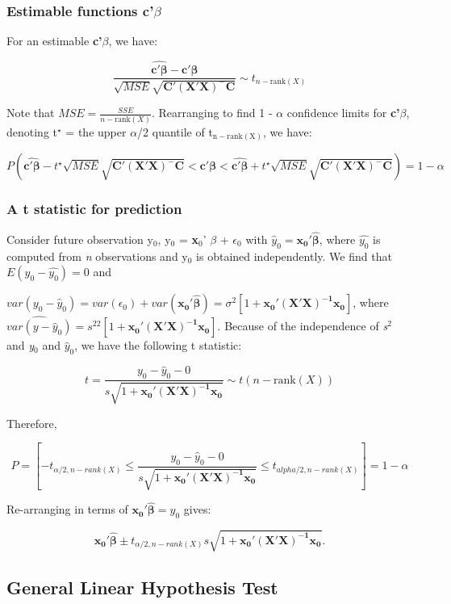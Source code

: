 \documentclass[11pt]{article}
\begin{document}
{\subsubsection{Estimable functions \textbf{c'$\beta$}}
\label{sec-4-2-2}


For an estimable \textbf{c'$\beta$}, we have:

$$\frac{\widehat{\mathbf{c'\beta}} -
\mathbf{c'\beta}}{\sqrt{MSE}\sqrt{\mathbf{C'(X'X)^{-}C}}} \sim
t_{n-\mathrm{rank}(X)}$$

Note that $MSE = \frac{SSE}{n-\mathrm{rank}(X)}$. Rearranging to find 1 - $\alpha$ confidence limits for \textbf{c'$\beta$},
denoting t$^{\star}$ = the upper $\alpha$/2 quantile of t$_{\mathrm{n-rank(X)}}$, we
have:

$$P\left( \widehat{\mathbf{c'\beta}} -
t^{\star}\sqrt{MSE}\sqrt{\mathbf{C'(X'X)^{-}C}} < \mathbf{c'\beta} <  \widehat{\mathbf{c'\beta}} +
t^{\star}\sqrt{MSE}\sqrt{\mathbf{C'(X'X)^{-}C}} \right) = 1 - \alpha$$
\subsubsection{A t statistic for prediction}
\label{sec-4-2-3}


Consider future observation y$_0$, y$_0$ = \textbf{x$_0$}' $\beta$ + $\epsilon$$_0$ with
$\hat{y}_0 = \mathbf{x_0'\hat{\beta}}$, where $\hat{y_0}$ is computed
from \emph{n} observations and y$_0$ is obtained independently. We find that
$E(y_0 - \hat{y_0}) = 0$ and 


$var(y_0 - \hat{y}_0) = var(\epsilon_0) +
var(\mathbf{x_0'\hat{\beta}}) = \sigma^2[1+
\mathbf{x_0'(X'X)^{-1}x_0}]$, where 
$\widehat{var(y - \hat{y}_0)} = s^22[1+ \mathbf{x_0'(X'X)^{-1}x_0}]$. Because of the independence of \emph{s$^2$}
and \emph{y$_0$} and $\hat{y}_0$, we have the following t statistic:

$$t = \frac{y_0 - \hat{y}_0 - 0}{s\sqrt{1+
\mathbf{x_0'(X'X)^{-1}x_0}}} \sim t(n-\mathrm{rank}(X))$$



Therefore,

$$P = \left[ -t_{\alpha/2,n-rank(X)} \leq \frac{y_0 - \hat{y}_0 - 0}{s\sqrt{1+
\mathbf{x_0'(X'X)^{-1}x_0}}} \leq t_{alpha/2,n-rank(X)}\right] = 1 -
\alpha$$

Re-arranging in terms of $\mathbf{x_0'\hat{\beta}} = \hat{y}_0$ gives:

$$\mathbf{x_0'\hat{\beta}} \pm t_{\alpha/2,n-rank(X)}s\sqrt{1+
\mathbf{x_0'(X'X)^{-1}x_0}}.$$
\subsection{General Linear Hypothesis Test}
\label{sec-4-3}

}
\end{document}
